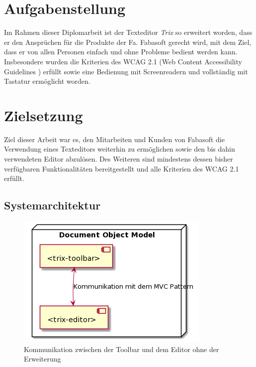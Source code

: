 \section{Aufgabenstellung}
Im Rahmen dieser Diplomarbeit ist der Texteditor {\em{Trix}} so erweitert worden, dass er den Ansprüchen für die Produkte der Fa. Fabasoft gerecht wird, mit dem Ziel, dass er von allen Personen einfach und ohne Probleme bedient werden kann. Insbesondere wurden die Kriterien des WCAG 2.1 (Web Content Accessibility Guidelines \cite{wcag_2_1_2018}) erfüllt sowie eine Bedienung mit Screenreadern und vollständig mit Tastatur ermöglicht worden.

\section{Zielsetzung}
Ziel dieser Arbeit war es, den Mitarbeiten und Kunden von Fabasoft die Verwendung eines Texteditors weiterhin zu ermöglichen sowie den bis dahin verwendeten Editor abzulösen. Des Weiteren sind mindestens dessen bisher verfügbaren Funktionalitäten bereitgestellt und alle Kriterien des WCAG 2.1 erfüllt.

\subsection{Systemarchitektur}
\begin{figure}[H]
\begin{center}
	\includegraphics[scale=.6]{images/trix_components.png}
\end{center}
	\caption{Kommunikation zwischen der Toolbar und dem Editor ohne der Erweiterung}
\end{figure}

